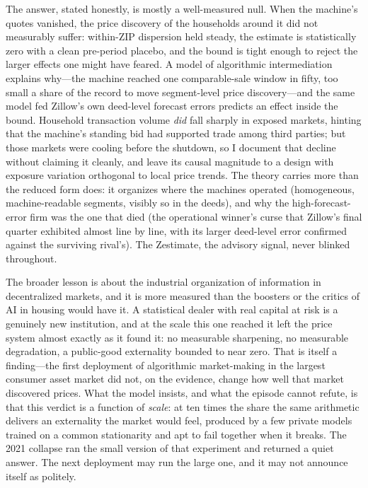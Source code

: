 \documentclass[12pt, letterpaper]{article}
\theoremstyle{remark}
\begin{document}
The answer, stated honestly, is mostly a well-measured null. When the machine's quotes vanished, the price discovery of the households around it did not measurably suffer: within-ZIP dispersion held steady, the estimate is statistically zero with a clean pre-period placebo, and the bound is tight enough to reject the larger effects one might have feared. A model of algorithmic intermediation explains why---the machine reached one comparable-sale window in fifty, too small a share of the record to move segment-level price discovery---and the same model fed Zillow's own deed-level forecast errors predicts an effect inside the bound. Household transaction volume \emph{did} fall sharply in exposed markets, hinting that the machine's standing bid had supported trade among third parties; but those markets were cooling before the shutdown, so I document that decline without claiming it cleanly, and leave its causal magnitude to a design with exposure variation orthogonal to local price trends. The theory carries more than the reduced form does: it organizes where the machines operated (homogeneous, machine-readable segments, visibly so in the deeds), and why the high-forecast-error firm was the one that died (the operational winner's curse that Zillow's final quarter exhibited almost line by line, with its larger deed-level error confirmed against the surviving rival's). The Zestimate, the advisory signal, never blinked throughout.

The broader lesson is about the industrial organization of information in decentralized markets, and it is more measured than the boosters or the critics of AI in housing would have it. A statistical dealer with real capital at risk is a genuinely new institution, and at the scale this one reached it left the price system almost exactly as it found it: no measurable sharpening, no measurable degradation, a public-good externality bounded to near zero. That is itself a finding---the first deployment of algorithmic market-making in the largest consumer asset market did not, on the evidence, change how well that market discovered prices. What the model insists, and what the episode cannot refute, is that this verdict is a function of \emph{scale}: at ten times the share the same arithmetic delivers an externality the market would feel, produced by a few private models trained on a common stationarity and apt to fail together when it breaks. The 2021 collapse ran the small version of that experiment and returned a quiet answer. The next deployment may run the large one, and it may not announce itself as politely.




\end{document}
